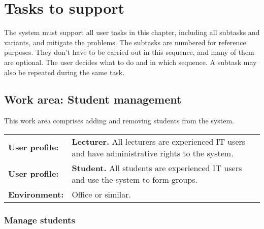 \documentclass[Main]{subfiles}
\begin{document}
\chapter{Tasks to support}\label{cha:C}
The system must support all user tasks in this chapter, including all subtasks and variants, and mitigate the problems. 
The subtasks are numbered for reference purposes. 
They don't have to be carried out in this sequence, and many of them are optional. 
The user decides what to do and in which sequence. 
A subtask may also be repeated during the same task.





\section{Work area: Student management}
This work area comprises adding and removing students from the system.

\begin{tabular}{l  p{13cm}}
 \textbf{User profile:} & \textbf{Lecturer.} All lecturers are experienced IT users and have administrative rights to the system. \\
 \textbf{User profile:} & \textbf{Student.} All students are experienced IT users and use the system to form groups.  \\
 \textbf{Environment:} & Office or similar.
\end{tabular}





\subsection{Manage students}\label{sec:ManageStudents}

\begin{DataIntro}
\end{DataIntro}
\end{document}
